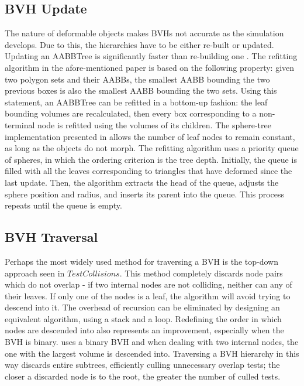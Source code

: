 
\subsection{BVH Update}
\label{sub-sec:bvhupdate}

The nature of deformable objects makes BVHs not accurate as the simulation develops. Due to this, the hierarchies have to be either re-built or updated. Updating an AABBTree is significantly faster than re-building one \citep{vdb97}. The refitting algorithm in the afore-mentioned paper is based on the following property: given two polygon sets and their AABBs, the smallest AABB bounding the two previous boxes is also the smallest AABB bounding the two sets. Using this statement, an AABBTree can be refitted in a bottom-up fashion: the leaf bounding volumes are recalculated, then every box corresponding to a non-terminal node is refitted using the volumes of its children. The sphere-tree implementation presented in \citep{rtsd01} allows the number of leaf nodes to remain constant, as long as the objects do not morph. The refitting algorithm uses a priority queue of spheres, in which the ordering criterion is the tree depth. Initially, the queue is filled with all the leaves corresponding to triangles that have deformed since the last update. Then, the algorithm extracts the head of the queue, adjusts the sphere position and radius, and inserts its parent into the queue. This process repeats until the queue is empty.

\subsection{BVH Traversal}
\label{sub-sec:traversal}

Perhaps the most widely used method for traversing a BVH is the top-down approach seen in \hyperref[alg:BVHQuery]{$TestCollisions$}. This method completely discards node pairs which do not overlap - if two internal nodes are not colliding, neither can any of their leaves. If only one of the nodes is a leaf, the algorithm will avoid trying to descend into it. The overhead of recursion can be eliminated by designing an equivalent algorithm, using a stack and a loop. Redefining the order in which nodes are descended into also represents an improvement, especially when the BVH is binary. \citep{vdb97} uses a binary BVH and when dealing with two internal nodes, the one with the largest volume is descended into. Traversing a BVH hierarchy in this way discards entire subtrees, efficiently culling unnecessary overlap tests; the closer a discarded node is to the root, the greater the number of culled tests.


